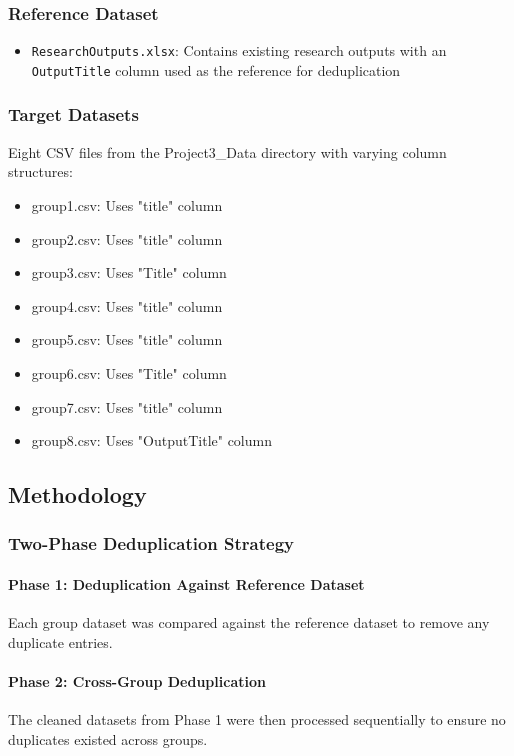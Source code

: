 \documentclass[12pt]{article}
\begin{document}
\subsubsection{Reference Dataset}
\begin{itemize}
    \item \texttt{ResearchOutputs.xlsx}: Contains existing research outputs with an \texttt{OutputTitle} column used as the reference for deduplication
\end{itemize}

\subsubsection{Target Datasets}
Eight CSV files from the Project3\_Data directory with varying column structures:
\begin{itemize}
    \item group1.csv: Uses "title" column
    \item group2.csv: Uses "title" column
    \item group3.csv: Uses "Title" column
    \item group4.csv: Uses "title" column
    \item group5.csv: Uses "title" column
    \item group6.csv: Uses "Title" column
    \item group7.csv: Uses "title" column
    \item group8.csv: Uses "OutputTitle" column
\end{itemize}

\subsection{Methodology}

\subsubsection{Two-Phase Deduplication Strategy}

\paragraph{Phase 1: Deduplication Against Reference Dataset}
Each group dataset was compared against the reference dataset to remove any duplicate entries.

\paragraph{Phase 2: Cross-Group Deduplication}
The cleaned datasets from Phase 1 were then processed sequentially to ensure no duplicates existed across groups.
\end{document}
